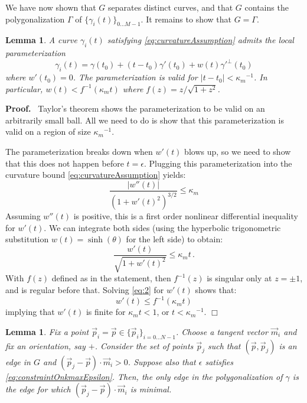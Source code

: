 \documentclass{article}
\newenvironment{proof}{
  \noindent\textbf{Proof.}\ }{\hspace*{\fill}
  \begin{math}\Box\end{math}\medskip}
\newtheorem{lemma}[cntr]{Lemma}
\numberwithin{cntr}{section}
\numberwithin{equation}{section}
\newcommand{\abs}[1]{\left| #1 \right|}%
\newcommand{\vp}[0]{{\vec{p}}}
\newcommand{\vm}[0]{{\vec{m}}}
\newcommand{\Oto}[1]{{0 \ldots #1-1}}
\newcommand{\OtoN}{{0 \ldots N-1}}
\newcommand{\pointData}{{ \{ \vp_{i} \}_{i=\OtoN} }}
\newcommand{\curveSet}{{ \{ \gamma_i(t) \}_{\Oto{M}}}}
\newcommand{\curvemax}{{\kappa_{m}}}
\newcommand{\curvemaxi}{{\curvemax^{-1}}}
\begin{document}
We have now shown that $G$ separates distinct curves, and that $G$ contains the polygonalization $\Gamma$ of $\curveSet$. It remains to show that $G = \Gamma$.

\begin{lemma}
  \label{lem:localGraphParameterization}
  A curve $\gamma_{i}(t)$ satisfying \eqref{eq:curvatureAssumption} admits the local parameterization
  \begin{equation}
    \label{eq:localGraphParameterization}
    \gamma_{i}(t) = \gamma(t_{0}) + (t-t_{0})\gamma'(t_{0}) + w(t) \gamma'^{\perp}(t_{0})
  \end{equation}
  where $w'(t_{0})=0$. The parameterization is valid for $\abs{t-t_{0}} < \curvemaxi$. In particular, $w(t) < f^{-1}(\curvemax t) $ where $f(z)=z / \sqrt{1+z^{2}}$.
\end{lemma}

\begin{proof}
  Taylor's theorem shows the parameterization to be valid on an arbitrarily small ball. All we need to do is show that this parameterization is valid on a region of size $\curvemaxi$.

  The parameterization breaks down when $w'(t)$ blows up, so we need to show that this does not happen before $t=\epsilon$. Plugging this parameterization into the curvature bound \eqref{eq:curvatureAssumption} yields:
  \begin{equation*}
    \frac{ \abs{w''(t)} }{(1+w'(t)^{2})^{3/2}} \leq \curvemax
  \end{equation*}
  Assuming $w''(t)$ is positive, this is a first order nonlinear differential inequality for $w'(t)$. We can integrate both sides (using the hyperbolic trigonometric substitution $w(t)=\sinh(\theta)$ for the left side) to obtain:
  \begin{equation}
    \label{eq:2}
    \frac{w'(t)}{\sqrt{1+w'(t)^{2}}} \leq \curvemax t \, .
  \end{equation}
  With $f(z)$ defined as in the statement, then $f^{-1}(z)$ is singular only at $z=\pm 1$, and is regular before that. Solving \eqref{eq:2} for $w'(t)$ shows that:
  \begin{equation*}
    w'(t) \leq f^{-1}(\curvemax t)
  \end{equation*}
  implying that $w'(t)$ is finite for $\curvemax t < 1$, or $t < \curvemaxi$.
\end{proof}

\begin{lemma}
  \label{lem:closestTangentPointInAllowedRegionIsCorrect}
  Fix a point $\vp_{i}=\vp \in \pointData$. Choose a tangent vector $\vm_{i}$ and fix an orientation, say $+$. Consider the set of points $\vp_{j}$ such that $(\vp, \vp_{j})$ is an edge in $G$ and $(\vp_{j} - \vp) \cdot \vm_{i} > 0$. Suppose also that $\epsilon$ satisfies \eqref{eq:constraintOnkmaxEpsilon}.
Then, the only edge in the polygonalization of $\gamma$ is the edge for which $(\vp_{j} - \vp) \cdot \vm_{i}$ is minimal.
\end{lemma}
\end{document}
